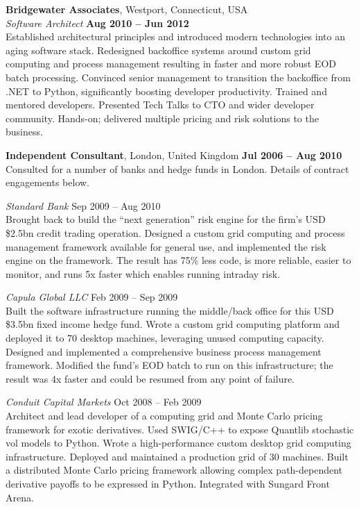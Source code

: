 \documentclass[margin,line]{resume}
\begin{document}
\begin{resume}
    \textbf{Bridgewater Associates}, Westport, Connecticut, USA \vspace{2mm}\\\vspace{1mm}%
    \textsl{Software Architect} \hfill \textbf{Aug 2010 -- Jun 2012}\\
    Established architectural principles and introduced modern technologies into an aging software stack. 
    Redesigned backoffice systems around custom grid computing and process management resulting in faster and more 
    robust EOD batch processing. Convinced senior management to transition the backoffice from .NET to Python, 
    significantly boosting developer productivity. 
    Trained and mentored developers. Presented Tech Talks to CTO and wider developer community. Hands-on; delivered 
    multiple pricing and risk solutions to the business. 

	\textbf{Independent Consultant}, London, United Kingdom \hfill \textbf{Jul 2006 -- Aug 2010}\vspace{2mm}\\\vspace{1mm}%
    Consulted for a number of banks and hedge funds in London. Details of contract engagements below.\vspace{0mm}

    \textsl{Standard Bank} \hfill Sep 2009 -- Aug 2010\\
    Brought back to build the ``next generation'' risk engine for the firm's USD \$2.5bn credit trading operation. 
    Designed a custom grid computing and process management framework available for general use, and implemented 
    the risk engine on the framework. The result has 75\% less code, is more reliable,
    easier to monitor, and runs 5x faster which enables running intraday risk.

    \textsl{Capula Global LLC} \hfill Feb 2009 -- Sep 2009\\
    Built the software infrastructure running the middle/back office for this USD \$3.5bn fixed income hedge fund.
    Wrote a custom grid computing platform and deployed it to 70 desktop machines, leveraging unused computing capacity. 
    Designed and implemented a comprehensive business process management framework. Modified the
    fund's EOD batch to run on this infrastructure; the result was 4x faster and could be resumed from any point of failure.
    
    \vspace{5cm}
    \textsl{Conduit Capital Markets} \hfill Oct 2008 -- Feb 2009\\
   	Architect and lead developer of a computing grid and Monte Carlo pricing framework for exotic derivatives. Used SWIG/C++
   	to expose Quantlib stochastic vol models to Python. Wrote a
    high-performance custom desktop grid computing infrastructure. Deployed and maintained a production grid of 30 machines.
	Built a distributed Monte Carlo pricing framework allowing complex path-dependent derivative payoffs
    to be expressed in Python. Integrated with Sungard Front Arena. 
    

\end{resume}
\end{document}

